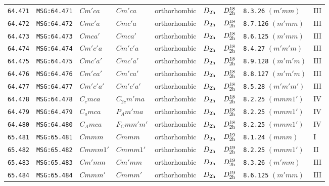 \documentclass[fleqn,10pt]{jsarticle}
\begin{document}
\begin{center}
\begin{longtable}{lllllllll}
\texttt{64.471} & \texttt{MSG:64.471} & $Cm'ca$ & $Cm'ca$ & orthorhombic & $D_{\rm 2h}$ & $D_{\rm 2h}^{18}$ & \texttt{8.3.26} $(m'mm)$ & III \\
\texttt{64.472} & \texttt{MSG:64.472} & $Cmc'a$ & $Cmc'a$ & orthorhombic & $D_{\rm 2h}$ & $D_{\rm 2h}^{18}$ & \texttt{8.7.126} $(m'mm)$ & III \\
\texttt{64.473} & \texttt{MSG:64.473} & $Cmca'$ & $Cmca'$ & orthorhombic & $D_{\rm 2h}$ & $D_{\rm 2h}^{18}$ & \texttt{8.6.125} $(m'mm)$ & III \\
\texttt{64.474} & \texttt{MSG:64.474} & $Cm'c'a$ & $Cm'c'a$ & orthorhombic & $D_{\rm 2h}$ & $D_{\rm 2h}^{18}$ & \texttt{8.4.27} $(m'm'm)$ & III \\
\texttt{64.475} & \texttt{MSG:64.475} & $Cmc'a'$ & $Cmc'a'$ & orthorhombic & $D_{\rm 2h}$ & $D_{\rm 2h}^{18}$ & \texttt{8.9.128} $(m'm'm)$ & III \\
\texttt{64.476} & \texttt{MSG:64.476} & $Cm'ca'$ & $Cm'ca'$ & orthorhombic & $D_{\rm 2h}$ & $D_{\rm 2h}^{18}$ & \texttt{8.8.127} $(m'm'm)$ & III \\
\texttt{64.477} & \texttt{MSG:64.477} & $Cm'c'a'$ & $Cm'c'a'$ & orthorhombic & $D_{\rm 2h}$ & $D_{\rm 2h}^{18}$ & \texttt{8.5.28} $(m'm'm')$ & III \\
\texttt{64.478} & \texttt{MSG:64.478} & $C_{c}mca$ & $C_{2c}m'ma$ & orthorhombic & $D_{\rm 2h}$ & $D_{\rm 2h}^{18}$ & \texttt{8.2.25} $(mmm1')$ & IV \\
\texttt{64.479} & \texttt{MSG:64.479} & $C_{a}mca$ & $P_{A}m'ma$ & orthorhombic & $D_{\rm 2h}$ & $D_{\rm 2h}^{18}$ & \texttt{8.2.25} $(mmm1')$ & IV \\
\texttt{64.480} & \texttt{MSG:64.480} & $C_{A}mca$ & $F_{C}mm'm'$ & orthorhombic & $D_{\rm 2h}$ & $D_{\rm 2h}^{18}$ & \texttt{8.2.25} $(mmm1')$ & IV \\ \hline
\texttt{65.481} & \texttt{MSG:65.481} & $Cmmm$ & $Cmmm$ & orthorhombic & $D_{\rm 2h}$ & $D_{\rm 2h}^{19}$ & \texttt{8.1.24} $(mmm)$ & I \\
\texttt{65.482} & \texttt{MSG:65.482} & $Cmmm1'$ & $Cmmm1'$ & orthorhombic & $D_{\rm 2h}$ & $D_{\rm 2h}^{19}$ & \texttt{8.2.25} $(mmm1')$ & II \\
\texttt{65.483} & \texttt{MSG:65.483} & $Cm'mm$ & $Cm'mm$ & orthorhombic & $D_{\rm 2h}$ & $D_{\rm 2h}^{19}$ & \texttt{8.3.26} $(m'mm)$ & III \\
\texttt{65.484} & \texttt{MSG:65.484} & $Cmmm'$ & $Cmmm'$ & orthorhombic & $D_{\rm 2h}$ & $D_{\rm 2h}^{19}$ & \texttt{8.6.125} $(m'mm)$ & III \\

\end{longtable}
\end{center}
\end{document}
